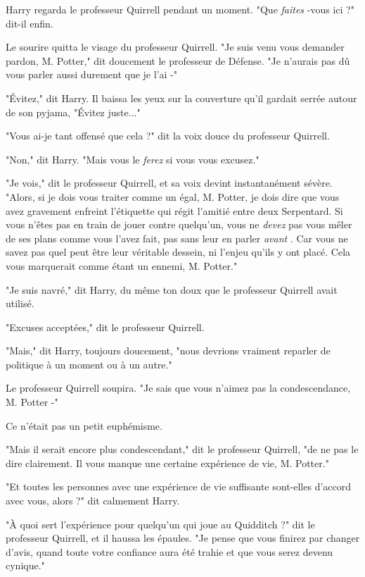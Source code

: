 Harry regarda le professeur Quirrell pendant un moment. "Que \emph{faites} -vous ici ?" dit-il enfin.

Le sourire quitta le visage du professeur Quirrell. "Je suis venu vous demander pardon, M. Potter," dit doucement le professeur de Défense. "Je n'aurais pas dû vous parler aussi durement que je l'ai -"

"Évitez," dit Harry. Il baissa les yeux sur la couverture qu'il gardait serrée autour de son pyjama, "Évitez juste..."

"Vous ai-je tant offensé que cela ?" dit la voix douce du professeur Quirrell.

"Non," dit Harry. "Mais vous le \emph{ferez}  si vous vous excusez."

"Je vois," dit le professeur Quirrell, et sa voix devint instantanément sévère. "Alors, si je dois vous traiter comme un égal, M. Potter, je dois dire que vous avez gravement enfreint l'étiquette qui régit l'amitié entre deux Serpentard. Si vous n'êtes pas en train de jouer contre quelqu'un, vous ne \emph{devez}  pas vous mêler de ses plans comme vous l'avez fait, pas sans leur en parler \emph{avant} . Car vous ne savez pas quel peut être leur véritable dessein, ni l'enjeu qu'ils y ont placé. Cela vous marquerait comme étant un ennemi, M. Potter."

"Je suis navré," dit Harry, du même ton doux que le professeur Quirrell avait utilisé.

"Excuses acceptées," dit le professeur Quirrell.

"Mais," dit Harry, toujours doucement, "nous devrions vraiment reparler de politique à un moment ou à un autre."

Le professeur Quirrell soupira. "Je sais que vous n'aimez pas la condescendance, M. Potter -"

Ce n'était pas un petit euphémisme.

"Mais il serait encore plus condescendant," dit le professeur Quirrell, "de ne pas le dire clairement. Il vous manque une certaine expérience de vie, M. Potter."

"Et toutes les personnes avec une expérience de vie suffisante sont-elles d'accord avec vous, alors ?" dit calmement Harry.

"À quoi sert l'expérience pour quelqu'un qui joue au Quidditch ?" dit le professeur Quirrell, et il haussa les épaules. "Je pense que vous finirez par changer d'avis, quand toute votre confiance aura été trahie et que vous serez devenu cynique."

